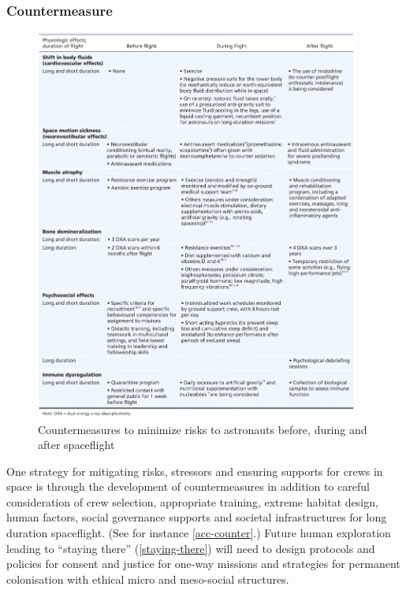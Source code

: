 \documentclass[letter,11pt]{article}
\begin{document}

 

\subsubsection*{Countermeasure}

\begin{figure}[htbp]
	\centering
	\includegraphics[width=0.95\textwidth]{SJTable4}
	\caption{Countermeasures to minimize risks to astronauts before, during and after spaceflight\cite{Williams2009}}
	\label{acc-counter}
\end{figure}

One strategy for mitigating risks, stressors and ensuring supports for crews in
space is through the development of countermeasures in addition to careful
consideration of crew selection, appropriate training, extreme habitat design,
human factors, social governance supports and societal infrastructures for long
duration spaceflight. (See for instance \autoref{acc-counter}.) Future human
exploration leading to ``staying there'' (\autoref{staying-there}) will need to
design protocols and policies for consent and justice for one-way missions and
strategies for permanent colonisation with ethical micro and meso-social
structures.
\end{document}
